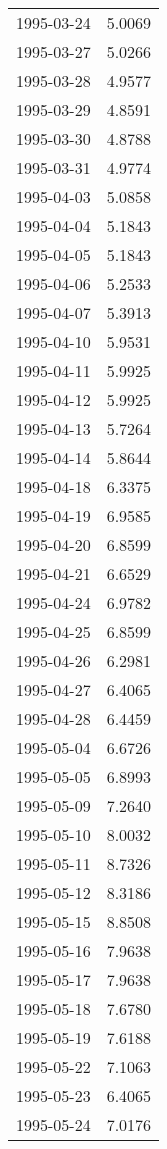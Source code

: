\begin{tabular}{lr}
1995-03-24 &      5.0069 \\
1995-03-27 &      5.0266 \\
1995-03-28 &      4.9577 \\
1995-03-29 &      4.8591 \\
1995-03-30 &      4.8788 \\
1995-03-31 &      4.9774 \\
1995-04-03 &      5.0858 \\
1995-04-04 &      5.1843 \\
1995-04-05 &      5.1843 \\
1995-04-06 &      5.2533 \\
1995-04-07 &      5.3913 \\
1995-04-10 &      5.9531 \\
1995-04-11 &      5.9925 \\
1995-04-12 &      5.9925 \\
1995-04-13 &      5.7264 \\
1995-04-14 &      5.8644 \\
1995-04-18 &      6.3375 \\
1995-04-19 &      6.9585 \\
1995-04-20 &      6.8599 \\
1995-04-21 &      6.6529 \\
1995-04-24 &      6.9782 \\
1995-04-25 &      6.8599 \\
1995-04-26 &      6.2981 \\
1995-04-27 &      6.4065 \\
1995-04-28 &      6.4459 \\
1995-05-04 &      6.6726 \\
1995-05-05 &      6.8993 \\
1995-05-09 &      7.2640 \\
1995-05-10 &      8.0032 \\
1995-05-11 &      8.7326 \\
1995-05-12 &      8.3186 \\
1995-05-15 &      8.8508 \\
1995-05-16 &      7.9638 \\
1995-05-17 &      7.9638 \\
1995-05-18 &      7.6780 \\
1995-05-19 &      7.6188 \\
1995-05-22 &      7.1063 \\
1995-05-23 &      6.4065 \\
1995-05-24 &      7.0176 \\

\end{tabular}

